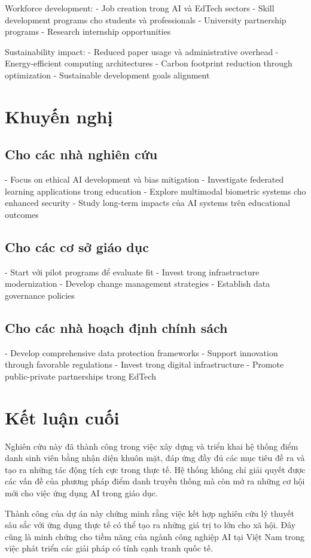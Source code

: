 \documentclass[12pt,a4paper]{report}
\begin{document}
Workforce development:
- Job creation trong AI và EdTech sectors
- Skill development programs cho students và professionals
- University partnership programs
- Research internship opportunities

Sustainability impact:
- Reduced paper usage và administrative overhead
- Energy-efficient computing architectures
- Carbon footprint reduction through optimization
- Sustainable development goals alignment

\section{Khuyến nghị}
\subsection{Cho các nhà nghiên cứu}
- Focus on ethical AI development và bias mitigation
- Investigate federated learning applications trong education
- Explore multimodal biometric systems cho enhanced security
- Study long-term impacts của AI systems trên educational outcomes

\subsection{Cho các cơ sở giáo dục}
- Start với pilot programs để evaluate fit
- Invest trong infrastructure modernization
- Develop change management strategies
- Establish data governance policies

\subsection{Cho các nhà hoạch định chính sách}
- Develop comprehensive data protection frameworks
- Support innovation through favorable regulations
- Invest trong digital infrastructure
- Promote public-private partnerships trong EdTech

\section{Kết luận cuối}
Nghiên cứu này đã thành công trong việc xây dựng và triển khai hệ thống điểm danh sinh viên bằng nhận diện khuôn mặt, đáp ứng đầy đủ các mục tiêu đề ra và tạo ra những tác động tích cực trong thực tế. Hệ thống không chỉ giải quyết được các vấn đề của phương pháp điểm danh truyền thống mà còn mở ra những cơ hội mới cho việc ứng dụng AI trong giáo dục.

Thành công của dự án này chứng minh rằng việc kết hợp nghiên cứu lý thuyết sâu sắc với ứng dụng thực tế có thể tạo ra những giá trị to lớn cho xã hội. Đây cũng là minh chứng cho tiềm năng của ngành công nghiệp AI tại Việt Nam trong việc phát triển các giải pháp có tính cạnh tranh quốc tế.
\end{document}
